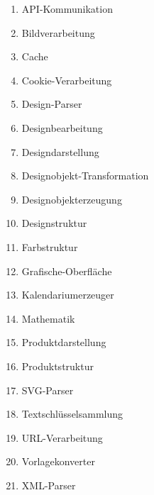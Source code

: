 \begin{enumerate}
\item API-Kommunikation 
\item Bildverarbeitung  
\item Cache 
\item Cookie-Verarbeitung  
\item Design-Parser 	
\item Designbearbeitung 
\item Designdarstellung  
\item Designobjekt-Transformation
\item Designobjekterzeugung 
\item Designstruktur 
\item Farbstruktur 
\item Grafische-Oberfläche 
\item Kalendariumerzeuger 
\item Mathematik  
\item Produktdarstellung 
\item Produktstruktur 
\item SVG-Parser 
\item Textschlüsselsammlung 
\item URL-Verarbeitung 
\item Vorlagekonverter 
\item XML-Parser	
\end{enumerate} 